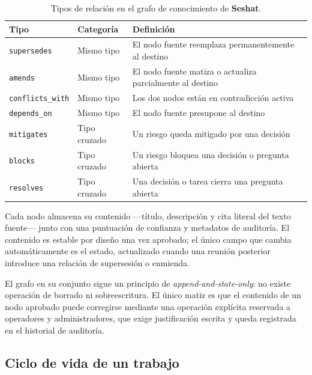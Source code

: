 \begin{table}[H]
  \centering
  \begin{tabularx}{\textwidth}{ll>{\raggedright\arraybackslash}X}
    \toprule
    \textbf{Tipo} & \textbf{Categoría} & \textbf{Definición} \\
    \midrule
    \texttt{supersedes}      & Mismo tipo   & El nodo fuente reemplaza permanentemente al destino \\
    \texttt{amends}          & Mismo tipo   & El nodo fuente matiza o actualiza parcialmente al destino \\
    \texttt{conflicts\_with} & Mismo tipo   & Los dos nodos están en contradicción activa \\
    \texttt{depends\_on}     & Mismo tipo   & El nodo fuente presupone al destino \\
    \texttt{mitigates}       & Tipo cruzado & Un riesgo queda mitigado por una decisión \\
    \texttt{blocks}          & Tipo cruzado & Un riesgo bloquea una decisión o pregunta abierta \\
    \texttt{resolves}        & Tipo cruzado & Una decisión o tarea cierra una pregunta abierta \\
    \bottomrule
  \end{tabularx}
  \caption{Tipos de relación en el grafo de conocimiento de \textbf{Seshat}.}
  \label{tab:rel-types}
\end{table}

Cada nodo almacena su contenido —título, descripción y cita literal del texto fuente— junto con
una puntuación de confianza y metadatos de auditoría. El contenido es estable por diseño una vez
aprobado; el único campo que cambia automáticamente es el estado, actualizado cuando una reunión
posterior introduce una relación de supersesión o enmienda.

El grafo en su conjunto sigue un principio de \textit{append-and-state-only}: no existe operación
de borrado ni sobreescritura. El único matiz es que el contenido de un nodo aprobado puede
corregirse mediante una operación explícita reservada a operadores y administradores, que exige
justificación escrita y queda registrada en el historial de auditoría.

\subsection{Ciclo de vida de un trabajo}

